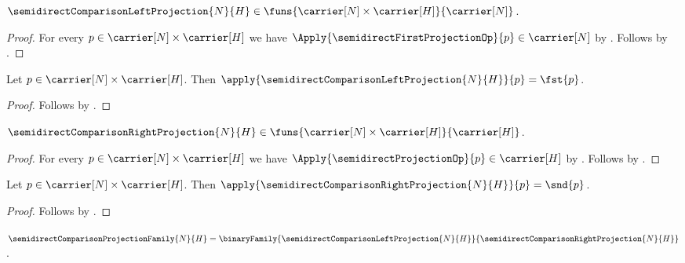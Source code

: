 \begin{proposition}\label{semidirect_comparison_left_projection_type}
    $\semidirectComparisonLeftProjection{N}{H}\in
        \funs{\carrier[N]\times\carrier[H]}{\carrier[N]}$.
\end{proposition}
\begin{proof}
    For every $p\in\carrier[N]\times\carrier[H]$ we have
        $\Apply{\semidirectFirstProjectionOp}{p}\in\carrier[N]$ by
        .
    Follows by
        .
\end{proof}

\begin{proposition}\label{semidirect_comparison_left_projection_apply}
    Let $p\in\carrier[N]\times\carrier[H]$.
    Then $\apply{\semidirectComparisonLeftProjection{N}{H}}{p}=
        \fst{p}$.
\end{proposition}
\begin{proof}
    Follows by
        .
\end{proof}

\begin{proposition}\label{semidirect_comparison_right_projection_type}
    $\semidirectComparisonRightProjection{N}{H}\in
        \funs{\carrier[N]\times\carrier[H]}{\carrier[H]}$.
\end{proposition}
\begin{proof}
    For every $p\in\carrier[N]\times\carrier[H]$ we have
        $\Apply{\semidirectProjectionOp}{p}\in\carrier[H]$ by
        .
    Follows by
        .
\end{proof}

\begin{proposition}\label{semidirect_comparison_right_projection_apply}
    Let $p\in\carrier[N]\times\carrier[H]$.
    Then $\apply{\semidirectComparisonRightProjection{N}{H}}{p}=
        \snd{p}$.
\end{proposition}
\begin{proof}
    Follows by
        .
\end{proof}

\begin{definition}\label{semidirect_comparison_projection_family}
    $\semidirectComparisonProjectionFamily{N}{H}=
        \binaryFamily
            {\semidirectComparisonLeftProjection{N}{H}}
            {\semidirectComparisonRightProjection{N}{H}}$.
\end{definition}

